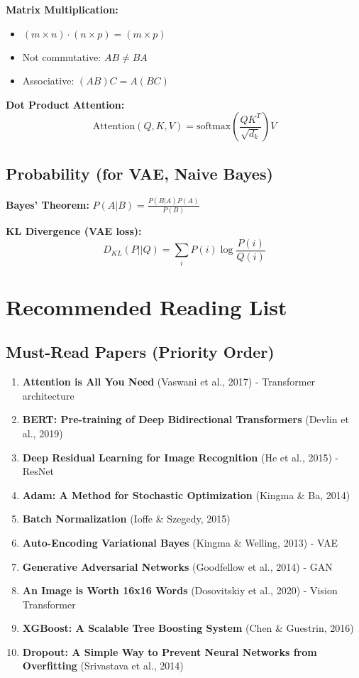 \documentclass[10pt]{article}
\begin{document}
\textbf{Matrix Multiplication:}
\begin{itemize}
\item $(m \times n) \cdot (n \times p) = (m \times p)$
\item Not commutative: $AB \neq BA$
\item Associative: $(AB)C = A(BC)$
\end{itemize}

\textbf{Dot Product Attention:}
$$\text{Attention}(Q, K, V) = \text{softmax}\left(\frac{QK^T}{\sqrt{d_k}}\right)V$$

\subsection{Probability (for VAE, Naive Bayes)}

\textbf{Bayes' Theorem:} $P(A|B) = \frac{P(B|A)P(A)}{P(B)}$

\textbf{KL Divergence (VAE loss):}
$$D_{KL}(P||Q) = \sum_i P(i) \log \frac{P(i)}{Q(i)}$$

\section{Recommended Reading List}

\subsection{Must-Read Papers (Priority Order)}

\begin{enumerate}
\item \textbf{Attention is All You Need} (Vaswani et al., 2017) - Transformer architecture
\item \textbf{BERT: Pre-training of Deep Bidirectional Transformers} (Devlin et al., 2019)
\item \textbf{Deep Residual Learning for Image Recognition} (He et al., 2015) - ResNet
\item \textbf{Adam: A Method for Stochastic Optimization} (Kingma \& Ba, 2014)
\item \textbf{Batch Normalization} (Ioffe \& Szegedy, 2015)
\item \textbf{Auto-Encoding Variational Bayes} (Kingma \& Welling, 2013) - VAE
\item \textbf{Generative Adversarial Networks} (Goodfellow et al., 2014) - GAN
\item \textbf{An Image is Worth 16x16 Words} (Dosovitskiy et al., 2020) - Vision Transformer
\item \textbf{XGBoost: A Scalable Tree Boosting System} (Chen \& Guestrin, 2016)
\item \textbf{Dropout: A Simple Way to Prevent Neural Networks from Overfitting} (Srivastava et al., 2014)
\end{enumerate}
\end{document}
